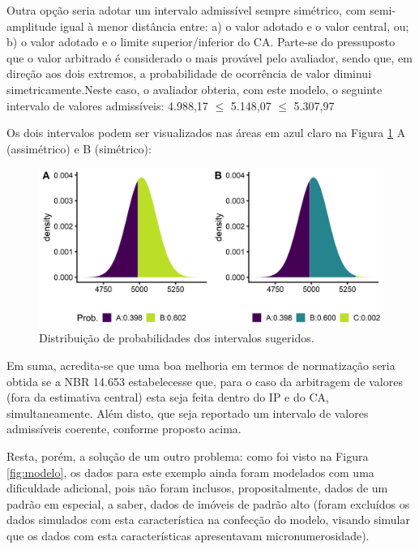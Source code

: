 \documentclass[
  a4paper, 11pt]{article}
\begin{document}
Outra opção seria adotar um intervalo admissível sempre simétrico, com
semi-amplitude igual à menor distância entre: a) o valor adotado e o
valor central, ou; b) o valor adotado e o limite superior/inferior do
CA. Parte-se do pressuposto que o valor arbitrado é considerado o mais
provável pelo avaliador, sendo que, em direção aos dois extremos, a
probabilidade de ocorrência de valor diminui simetricamente.Neste caso,
o avaliador obteria, com este modelo, o seguinte intervalo de valores
admissíveis: 4.988,17 \(\leq\) 5.148,07 \(\leq\) 5.307,97

Os dois intervalos podem ser visualizados nas áreas em azul claro na
Figura \ref{fig:dists} A (assimétrico) e B (simétrico):

\begin{figure}[H]

{\centering \includegraphics[width=1\linewidth]{images/dists-1} 

}

\caption{Distribuição de probabilidades dos intervalos sugeridos.}\label{fig:dists}
\end{figure}

Em suma, acredita-se que uma boa melhoria em termos de normatização
seria obtida se a NBR 14.653 estabelecesse que, para o caso da
arbitragem de valores (fora da estimativa central) esta seja feita
dentro do IP e do CA, simultaneamente. Além disto, que seja reportado um
intervalo de valores admissíveis coerente, conforme proposto acima.

Resta, porém, a solução de um outro problema: como foi visto na Figura
\ref{fig:modelo}, os dados para este exemplo ainda foram modelados com
uma dificuldade adicional, pois não foram inclusos, propositalmente,
dados de um padrão em especial, a saber, dados de imóveis de padrão alto
(foram excluídos os dados simulados com esta característica na confecção
do modelo, visando simular que os dados com esta características
apresentavam micronumerosidade).
\end{document}
